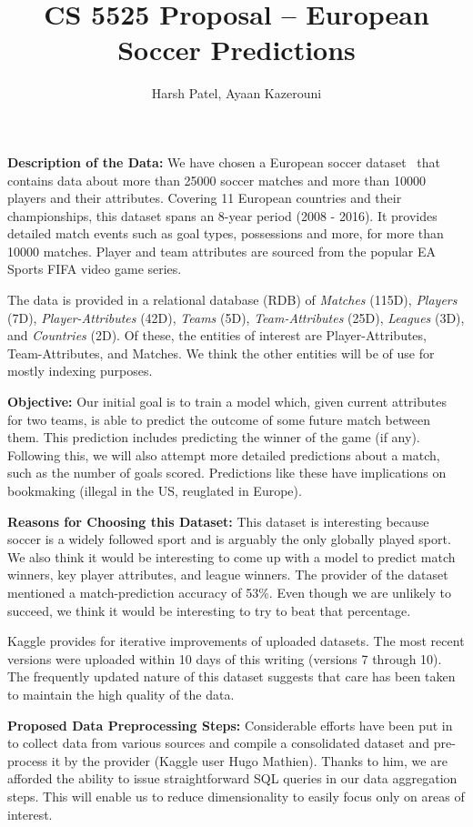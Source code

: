 \documentclass[11pt, letterpaper]{article}
\begin{document}
\title{CS 5525 Proposal -- European Soccer Predictions}
\author{Harsh Patel, Ayaan Kazerouni}
\date{}
\maketitle
\textbf{Description of the Data:} We have chosen a European soccer dataset~\cite{mathien1} that contains data about more than 25000 soccer matches and more than 10000 players and their attributes.
Covering 11 European countries and their championships, this dataset spans an 8-year period (2008 - 2016).
It provides detailed match events such as goal types, possessions and more, for more than 10000 matches.
Player and team attributes are sourced from the popular EA Sports FIFA video game series.

The data is provided in a relational database (RDB) of \textit{Matches} (115D), \textit{Players} (7D), \textit{Player-Attributes} (42D), \textit{Teams} (5D), \textit{Team-Attributes} (25D), \textit{Leagues} (3D), and \textit{Countries} (2D).
Of these, the entities of interest are Player-Attributes, Team-Attributes, and Matches.
We think the other entities will be of use for mostly indexing purposes.

\textbf{Objective:} Our initial goal is to train a model which, given current attributes for two teams, is able to predict the outcome of some future match between them.
This prediction includes predicting the winner of the game (if any).
Following this, we will also attempt more detailed predictions about a match, such as the number of goals scored.
Predictions like these have implications on bookmaking (illegal in the US, reuglated in Europe).

\textbf{Reasons for Choosing this Dataset:} This dataset is interesting because soccer is a widely followed sport and is arguably the only globally played sport.
We also think it would be interesting to come up with a model to predict match winners, key player attributes, and league winners.
The provider of the dataset mentioned a match-prediction accuracy of 53\%.
Even though we are unlikely to succeed, we think it would be interesting to try to beat that percentage.

Kaggle provides for iterative improvements of uploaded datasets.
The most recent versions were uploaded within 10 days of this writing (versions 7 through 10).
The frequently updated nature of this dataset suggests that care has been taken to maintain the high quality of the data.

\textbf{Proposed Data Preprocessing Steps:} Considerable efforts have been put in to collect data from various sources and compile a consolidated dataset and pre-process it by the provider (Kaggle user Hugo Mathien).
Thanks to him, we are afforded the ability to issue straightforward SQL queries in our data aggregation steps.
This will enable us to reduce dimensionality to easily focus only on areas of interest.
\end{document}
